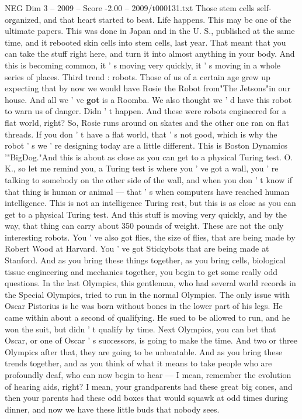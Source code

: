 \begin{textsample}{NEG Dim 3 – 2009 – Score -2.00 – 2009/t000131.txt}
Those stem cells self- organized, and that heart started to beat.
Life happens.
This may be one of the ultimate papers.
This was done in Japan and in the U.
S., published at the same time, and it rebooted skin cells into stem cells, last year.
That meant that you can take the stuff right here, and turn it into almost anything in your body.
And this is becoming common, it ' s moving very quickly, it ' s moving in a whole series of places.
Third trend : robots.
Those of us of a certain age grew up expecting that by now we would have Rosie the Robot from"The Jetsons"in our house.
And all we ' ve \textbf{got} is a Roomba.
We also thought we ' d have this robot to warn us of danger.
Didn ' t happen.
And these were robots engineered for a flat world, right?
So, Rosie runs around on skates and the other one ran on flat threads.
If you don ' t have a flat world, that ' s not good, which is why the robot ' s we ' re designing today are a little different.
This is Boston Dynamics '"BigDog."And this is about as close as you can get to a physical Turing test.
O.
K., so let me remind you, a Turing test is where you ' ve got a wall, you ' re talking to somebody on the other side of the wall, and when you don ' t know if that thing is human or animal — that ' s when computers have reached human intelligence.
This is not an intelligence Turing rest, but this is as close as you can get to a physical Turing test.
And this stuff is moving very quickly, and by the way, that thing can carry about 350 pounds of weight.
These are not the only interesting robots.
You ' ve also got flies, the size of flies, that are being made by Robert Wood at Harvard.
You ' ve got Stickybots that are being made at Stanford.
And as you bring these things together, as you bring cells, biological tissue engineering and mechanics together, you begin to get some really odd questions.
In the last Olympics, this gentleman, who had several world records in the Special Olympics, tried to run in the normal Olympics.
The only issue with Oscar Pistorius is he was born without bones in the lower part of his legs.
He came within about a second of qualifying.
He sued to be allowed to run, and he won the suit, but didn ' t qualify by time.
Next Olympics, you can bet that Oscar, or one of Oscar ' s successors, is going to make the time.
And two or three Olympics after that, they are going to be unbeatable.
And as you bring these trends together, and as you think of what it means to take people who are profoundly deaf, who can now begin to hear — I mean, remember the evolution of hearing aids, right?
I mean, your grandparents had these great big cones, and then your parents had these odd boxes that would squawk at odd times during dinner, and now we have these little buds that nobody sees.

\end{textsample}
